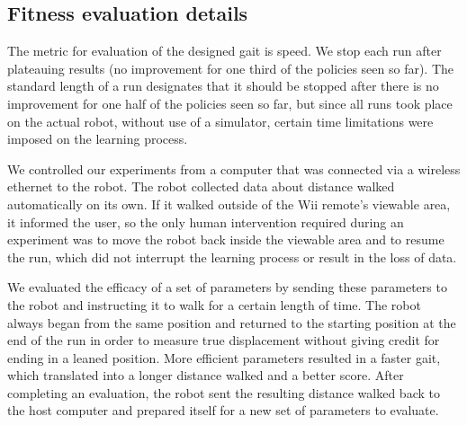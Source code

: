 \subsection{Fitness evaluation details}




The metric for evaluation of the designed gait is speed. We stop each 
run after plateauing results (no improvement for one third of the 
policies seen so far). The standard length of a run designates that it
should be stopped after there is no improvement for one half of the policies
seen so far, but since all runs took place on the actual robot, without use
of a simulator, certain time limitations were imposed on the learning process.

We controlled our experiments from a computer that was connected via a
wireless ethernet to the robot. The robot collected data about
distance walked automatically on its own. If it walked outside of the
Wii remote's viewable area, it informed the user, so the only human
intervention required during an experiment was to move the robot back
inside the viewable area and to resume the run, which did not
interrupt the learning process or result in the loss of data.

We evaluated the efficacy of a set of parameters by sending these
parameters to the robot and instructing it to walk for a certain
length of time. The robot always began from the same position and
returned to the starting position at the end of the run in order to
measure true displacement without giving credit for ending in a leaned
position. More efficient parameters resulted in a faster gait, which
translated into a longer distance walked and a better score. After completing
an evaluation, the robot sent the resulting distance walked back to the
host computer and prepared itself for a new set of parameters to evaluate.

